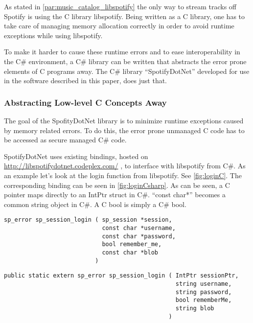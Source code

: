 As stated in \cref{par:music_catalog_libspotify} the only way to stream tracks off Spotify is using the C library libspotify. Being written as a C library, one has to take care of managing memory allocation correctly in order to avoid runtime exceptions while using libspotify. 

To make it harder to cause these runtime errors and to ease interoperability in the C\# environment, a C\# library can be written that abstracts the error prone elements of C programs away. The C\# library \enquote{SpotifyDotNet} developed for use in the software described in this paper, does just that.

\subsubsection{Abstracting Low-level C Concepts Away}
\label{ssub:abstracting_low_level_c_concepts_away}

The goal of the SpofityDotNet library is to minimize runtime exceptions caused by memory related errors. To do this, the error prone unmanaged C code has to be accessed as secure managed C\# code.

SpotifyDotNet uses existing bindings, hosted on \url{http://libspotifydotnet.codeplex.com/} , to interface with libspotify from C\#. As an example let's look at the login function from libspotify. See \cref{fig:loginC}. The corresponding binding can be seen in \cref{fig:loginCsharp}. As can be seen, a C pointer maps directly to an IntPtr struct in C\#. \enquote{const char*} becomes a common string object in C\#. A C bool is simply a C\# bool.

\begin{lstlisting}[caption = {Libspotify login function prototype - C}, label = {fig:loginC}]
sp_error sp_session_login ( sp_session *session,
                            const char *username,
                            const char *password,
                            bool remember_me,
                            const char *blob
                          )
\end{lstlisting}

\begin{lstlisting}[caption = {Login method using a external implementation from libspotify.dll - C\#}, label={fig:loginCsharp}]
public static extern sp_error sp_session_login ( IntPtr sessionPtr, 
                                                 string username, 
                                                 string password, 
                                                 bool rememberMe, 
                                                 string blob 
                                               )
\end{lstlisting}

